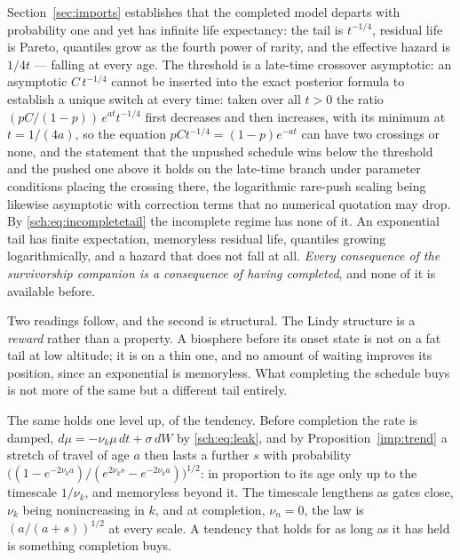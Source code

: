 Section~\ref{sec:imports} establishes that the completed model departs with
probability one and yet has infinite life expectancy: the tail is
$t^{-1/4}$, residual life is Pareto, quantiles grow as the fourth power
of rarity, and the effective hazard is $1/4t$ --- falling at every age. The threshold is a late-time crossover asymptotic: an asymptotic $C\,t^{-1/4}$ cannot be inserted into the exact posterior formula to establish a unique switch at every time: taken over all $t > 0$ the ratio $(pC/(1-p))\,e^{at}t^{-1/4}$ first decreases and then increases, with its minimum at $t = 1/(4a)$, so the equation $pCt^{-1/4} = (1-p)e^{-at}$ can have two crossings or none, and the statement that the unpushed schedule wins below the threshold and the pushed one above it holds on the late-time branch under parameter conditions placing the crossing there, the logarithmic rare-push scaling being likewise asymptotic with correction terms that no numerical quotation may drop.
By \eqref{sch:eq:incompletetail} the incomplete regime has none of it.
An exponential tail has finite expectation, memoryless residual life,
quantiles growing logarithmically, and a hazard that does not fall at
all. \emph{Every consequence of the survivorship companion \cite{GoldenSurvivorship} is a
consequence of having completed}, and none of it is available before.

Two readings follow, and the second is structural. The Lindy structure is a \emph{reward} rather than a property. A
biosphere before its onset state is not on a fat tail at low altitude;
it is on a thin one, and no amount of waiting improves its position,
since an exponential is memoryless. What completing the schedule buys is
not more of the same but a different tail entirely.

The same holds one level up, of the tendency. Before completion the rate
is damped, $d\mu=-\nu_k\mu\,dt+\sigma\,dW$ by \eqref{sch:eq:leak}, and by
Proposition~\ref{imp:trend} a stretch of travel of age $a$ then lasts a
further $s$ with probability
$\bigl((1-e^{-2\nu_ka})/(e^{2\nu_ks}-e^{-2\nu_ka})\bigr)^{1/2}$: in
proportion to its age only up to the timescale $1/\nu_k$, and memoryless
beyond it. The timescale lengthens as gates close, $\nu_k$ being
nonincreasing in $k$, and at completion, $\nu_n=0$, the law is
$(a/(a+s))^{1/2}$ at every scale. A tendency that
holds for as long as it has held is something completion buys.

